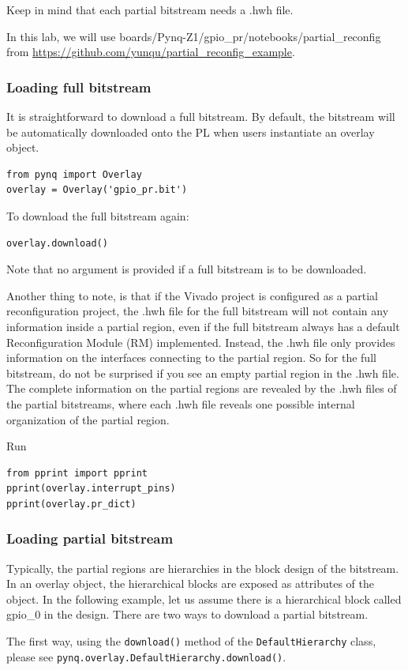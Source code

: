 \documentclass[a4paper,12pt,twoside]{article}
\begin{document}
Keep in mind that each partial bitstream needs a .hwh file.

In this lab, we will use boards/Pynq-Z1/gpio\_pr/notebooks/partial\_reconfig from \url{https://github.com/yunqu/partial_reconfig_example}.
\subsubsection{Loading full bitstream}
It is straightforward to download a full bitstream. By default, the bitstream will be automatically downloaded onto the PL when users instantiate an overlay object.
\begin{verbatim}
from pynq import Overlay
overlay = Overlay('gpio_pr.bit')
\end{verbatim}
To download the full bitstream again:
\begin{verbatim}
overlay.download()
\end{verbatim}
Note that no argument is provided if a full bitstream is to be downloaded.

Another thing to note, is that if the Vivado project is configured as a partial reconfiguration project, the .hwh file for the full bitstream will not contain any information inside a partial region, even if the full bitstream always has a default Reconfiguration Module (RM) implemented. Instead, the .hwh file only provides information on the interfaces connecting to the partial region. So for the full bitstream, do not be surprised if you see an empty partial region in the .hwh file. The complete information on the partial regions are revealed by the .hwh files of the partial bitstreams, where each .hwh file reveals one possible internal organization of the partial region.

Run
\begin{verbatim}
from pprint import pprint
pprint(overlay.interrupt_pins)
pprint(overlay.pr_dict)
\end{verbatim}
\subsubsection{Loading partial bitstream}
Typically, the partial regions are hierarchies in the block design of the bitstream. In an overlay object, the hierarchical blocks are exposed as attributes of the object. In the following example, let us assume there is a hierarchical block called gpio\_0 in the design. There are two ways to download a partial bitstream.

The first way, using the \texttt{download()} method of the \texttt{DefaultHierarchy} class, please see \texttt{pynq.overlay.DefaultHierarchy.download()}.
\end{document}
